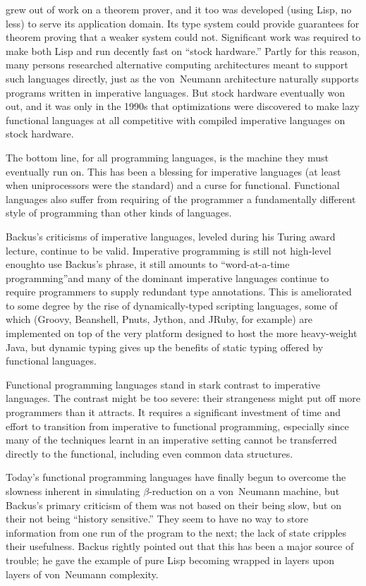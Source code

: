 \ML grew out of work on a theorem prover, and it too was developed (using Lisp, no less) to serve its application domain. Its type system could provide guarantees for theorem proving that a weaker system could not. Significant work was required to make both Lisp and \ML run decently fast on ``stock hardware.'' Partly for this reason, many persons researched alternative computing architectures meant to support such languages directly, just as the von~Neumann architecture naturally supports programs written in imperative languages. But stock hardware eventually won out, and it was only in the 1990s that optimizations were discovered to make lazy functional languages at all competitive with compiled imperative languages on stock hardware.

The bottom line, for all programming languages, is the machine they must eventually run on. This has been a blessing for imperative languages (at least when uniprocessors were the standard) and a curse for functional. Functional languages also suffer from requiring of the programmer a fundamentally different style of programming than other kinds of languages.

Backus's criticisms of imperative languages, leveled during his Turing award lecture, continue to be valid. Imperative programming is still not high-level enough\empause to use Backus's phrase, it still amounts to ``word-at-a-time programming''\empause and many of the dominant imperative languages continue to require programmers to supply redundant type annotations. This is ameliorated to some degree by the rise of dynamically-typed scripting languages, some of which (Groovy, Beanshell, Pnuts, Jython, and JRuby, for example) are implemented on top of the very platform designed to host the more heavy-weight Java, but dynamic typing gives up the benefits of static typing offered by functional languages.

Functional programming languages stand in stark contrast to imperative languages. The contrast might be too severe: their strangeness might put off more programmers than it attracts. It requires a significant investment of time and effort to transition from imperative to functional programming, especially since many of the techniques learnt in an imperative setting cannot be transferred directly to the functional, including even common data structures.

Today's functional programming languages have finally begun to overcome the slowness inherent in simulating $\beta$-re\-duc\-tion on a von~Neumann machine, but Backus's primary criticism of them was not based on their being slow, but on their not being ``history sensitive.'' They seem to have no way to store information from one run of the program to the next; the lack of state cripples their usefulness. Backus rightly pointed out that this has been a major source of trouble; he gave the example of pure Lisp becoming wrapped in layers upon layers of von~Neumann complexity.


